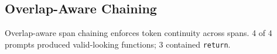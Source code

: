 \subsection{Overlap-Aware Chaining}
Overlap-aware span chaining enforces token continuity across spans.
4 of 4 prompts produced valid-looking functions; 3 contained \texttt{return}.
